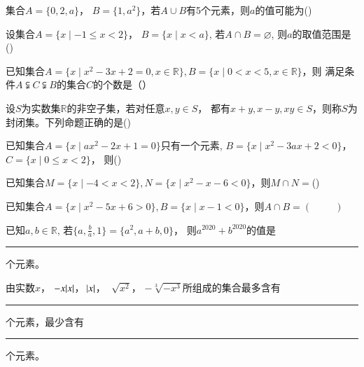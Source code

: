\newpage
\begin{problemset}
	\item 集合$A=\{0,2,a\}$， $B=\{1, a^2\}$，若$A \cup B$有5个元素，则$a$的值可能为(\hspace{1cm})
	\item 设集合$A=\{x \mid -1 \leq x < 2 \}$， $B=\{x \mid x < a \}$, 若$A \cap B = \varnothing$, 则$a$的取值范围是(\hspace{1cm})
	\item 已知集合$A=\{x \mid x^2-3x+2=0, x \in \mathbb{R} \}, B=\{x \mid 0<x<5, x \in  \mathbb{R} \}$，则 满足条件$A \subsetneqq C \subsetneqq B$的集合$C$的个数是（\hspace{1cm}）
	\item 设$S$为实数集$\mathbb{R}$的非空子集，若对任意$x, y \in S$， 都有$x+y, x-y, xy \in S$，则称$S$为封闭集。下列命题正确的是(\hspace{1cm})
	\item  已知集合$A=\{x \mid ax^2-2x+1=0\}$只有一个元素, $B=\{x \mid x^2 -3ax + 2 <0\}$， $C=\{x \mid 0 \leq x < 2\}$， 则(\hspace{1cm}) 
	\item 已知集合$M=\{x \mid -4<x<2\}, N=\{x \mid x^2-x-6<0\}$，则$M \cap N = $(\hspace{1cm})
	\item 已知集合$A=\{x \mid x^2-5x+6>0 \}, B=\{x \mid x-1<0 \}$，则$A \cap B = \left(\hspace{1cm}\right)$
	\item  已知$a, b \in \mathbb{R}$, 若$\displaystyle \{a, \frac{b}{a}, 1 \} = \{a^2, a+b, 0 \}$， 则$a^{2020}+b^{2020}$的值是\rule{1cm}{0.1mm}个元素。
	\item  由实数$x$， $-x \abs{x}$， $\abs{x}$， $\sqrt[]{x^2}$， $-\sqrt[3]{-x^3}$所组成的集合最多含有\rule{1cm}{0.1mm}个元素，最少含有\rule{1cm}{0.1mm}个元素。
\end{problemset}